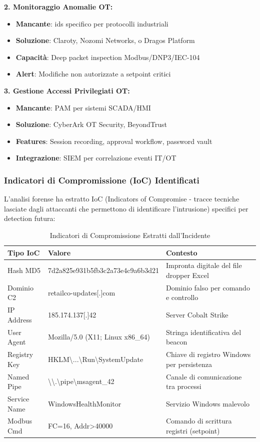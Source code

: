 \textbf{2. Monitoraggio Anomalie OT:}
\begin{itemize}
    \item \textbf{Mancante}: \gls{ids} specifico per protocolli industriali
    \item \textbf{Soluzione}: Claroty, Nozomi Networks, o Dragos Platform
    \item \textbf{Capacità}: Deep packet inspection Modbus/DNP3/IEC-104
    \item \textbf{Alert}: Modifiche non autorizzate a setpoint critici
\end{itemize}

\textbf{3. Gestione Accessi Privilegiati OT:}
\begin{itemize}
    \item \textbf{Mancante}: PAM per sistemi SCADA/HMI
    \item \textbf{Soluzione}: CyberArk OT Security, BeyondTrust
    \item \textbf{Features}: Session recording, approval workflow, password vault
    \item \textbf{Integrazione}: SIEM per correlazione eventi IT/OT
\end{itemize}

\subsubsection{\texorpdfstring{Indicatori di Compromissione (IoC) Identificati}{4.5.2.2 - Indicatori di Compromissione (IoC) Identificati}}

L'analisi forense ha estratto IoC (Indicators of Compromise - tracce tecniche lasciate dagli attaccanti che permettono di identificare l'intrusione) specifici per detection futura:

\begin{table}[htbp]
\centering
\caption{Indicatori di Compromissione Estratti dall'Incidente}
\label{tab:ioc_retailco}
\begin{tabular}{|l|l|p{5cm}|}
\hline
\textbf{Tipo IoC} & \textbf{Valore} & \textbf{Contesto} \\
\hline
Hash MD5 & 7d2a825e931b5fb3c2a73e4c9a6b3d21 & Impronta digitale del file dropper Excel \\
Dominio C2 & retailco-updates[.]com & Dominio falso per comando e controllo \\
IP Address & 185.174.137[.]42 & Server Cobalt Strike \\
User Agent & Mozilla/5.0 (X11; Linux x86\_64) & Stringa identificativa del beacon \\
Registry Key & HKLM\textbackslash{}...\textbackslash{}Run\textbackslash{}SystemUpdate & Chiave di registro Windows per persistenza \\
Named Pipe & \textbackslash{}\textbackslash{}.\textbackslash{}pipe\textbackslash{}msagent\_42 & Canale di comunicazione tra processi \\
Service Name & WindowsHealthMonitor & Servizio Windows malevolo \\
Modbus Cmd & FC=16, Addr>40000 & Comando di scrittura registri (setpoint) \\
\hline
\end{tabular}
\end{table}


